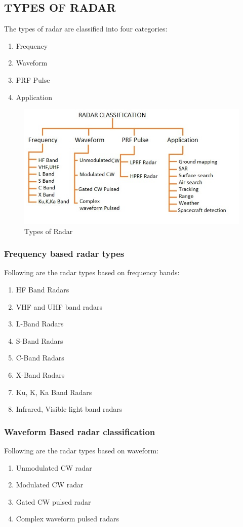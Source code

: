 \documentclass[12pt]{article} %
\begin{document}
\subsection{ TYPES OF RADAR}
\noindent The types of radar are classified into four categories:
\begin{enumerate}
\item	Frequency 
\item	Waveform 
\item	PRF Pulse 
\item	Application
\end{enumerate}
 \begin{figure}[H]
  \includegraphics[width=\linewidth]{radartypes.png}
  \caption{ Types of Radar}
  \label{fig:figure 10}
\end{figure}

\subsubsection{Frequency based radar types}
\noindent  Following are the radar types based on frequency bands:
 \begin{enumerate}
\item	HF Band Radars
\item	VHF and UHF band radars
\item	L-Band Radars
\item	S-Band Radars 
\item	C-Band Radars 
\item	X-Band Radars 
\item	Ku, K, Ka Band Radars 
\item	Infrared, Visible light band radars
\end{enumerate}

\subsubsection{Waveform Based radar classification}
 \noindent Following are the radar types based on waveform:
\begin{enumerate}
\item	Unmodulated CW radar
\item	Modulated CW radar
\item	Gated CW pulsed radar
\item	Complex waveform pulsed radars
\end{enumerate}
\end{document}
